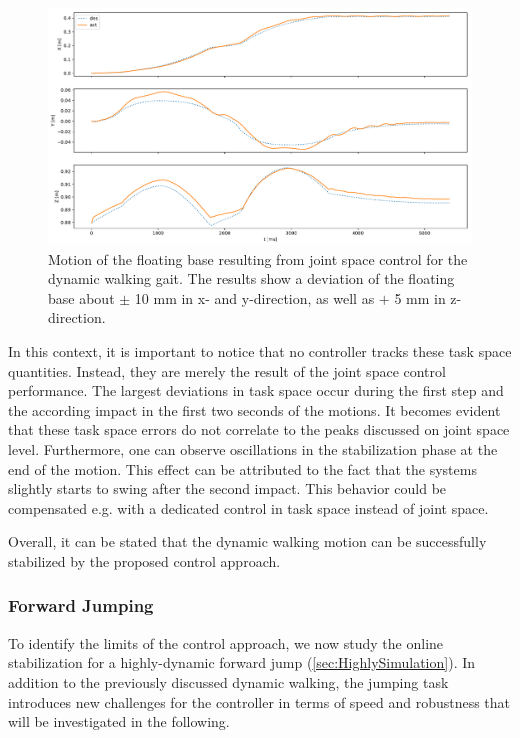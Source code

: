 \begin{figure}
\centering	
\includegraphics[width=.85\textwidth]{fig/walkDynamic/pybullet/pybulletBase}
\caption[Motion of the floating base for dynamic walking]{Motion of the floating base resulting from joint space control for the dynamic walking gait. The results show a deviation of the floating base about $\pm$ 10 \nolinebreak mm in x- and y-direction, as well as $+$ 5 mm in z-direction.}
\label{fig:walkDynamic_pybulletBase}
\end{figure}

In this context, it is important to notice that no controller tracks these task space quantities. Instead, they are merely the result of the joint space control performance. The largest deviations in task space occur during the first step and the according impact in the first two seconds of the motions. It becomes evident that these task space errors do not correlate to the peaks discussed on joint space level. Furthermore, one can observe oscillations in the stabilization phase at the end of the motion. This effect can be attributed to the fact that the systems slightly starts to swing after the second impact. This behavior could be compensated e.g. with a dedicated control in task space instead of joint space. 

Overall, it can be stated that the dynamic walking motion can be successfully stabilized by the proposed control approach. 

\subsubsection{Forward Jumping}
To identify the limits of the control approach, we now study the online stabilization for a highly-dynamic forward jump (\cref{sec:HighlySimulation}). In addition to the previously discussed dynamic walking, the jumping task introduces new challenges for the controller in terms of speed and robustness that will be investigated in the following.  

